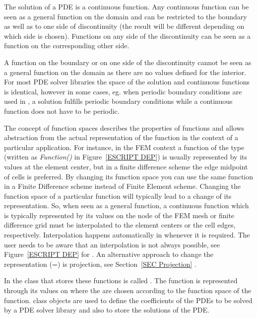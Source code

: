 The solution of a PDE is a continuous function. Any continuous function can be seen as a general function
on the domain and can be restricted to the boundary as well as to one side of
discontinuity (the result will be different depending on 
which side is chosen). Functions on any side of the  
discontinuity can be seen as a function on the corresponding other side. 

A function on the boundary or on one side of
the discontinuity cannot be seen as a general function on the domain as there are no values 
defined for the interior. For most PDE solver libraries
the space of the solution and continuous functions is identical, however in some cases, eg.
when periodic boundary conditions are used in \finley, a solution 
fulfills periodic boundary conditions while a continuous function does not have to be periodic.

The concept of function spaces describes the properties of 
functions and allows abstraction from the actual representation 
of the function in the context of a particular application. For instance, 
in the FEM context a
function of the \Function type (written as \emph{Function()} in Figure~\ref{ESCRIPT DEP})
is usually represented by its values at the element center, 
but in a finite difference scheme the edge midpoint of cells is preferred. 
By changing its function space you can use the same function in a Finite Difference
scheme instead of Finite Element scheme.
Changing the function space of a particular function
will typically lead to a change of its representation. 
So, when seen as a general function,
a continuous function which is typically represented by its values
on the node of the FEM mesh or finite difference grid 
must be interpolated to the element centers or the cell edges,
respectively. Interpolation happens automatically in \escript
whenever it is required. The user needs to be aware that an
interpolation is not always possible, see Figure~\ref{ESCRIPT DEP} for \finley.
An alternative approach to change the representation (=\FunctionSpace) is 
projection, see Section~\ref{SEC Projection}
.


In \escript the class that stores these functions is called \Data.
The function is represented through its values on \DataSamplePoints where
the \DataSamplePoints are chosen according to the function space 
of the function.  
\Data class objects are used to define the coefficients
of the PDEs to be solved by a PDE solver library 
and also to store the solutions of the PDE.

